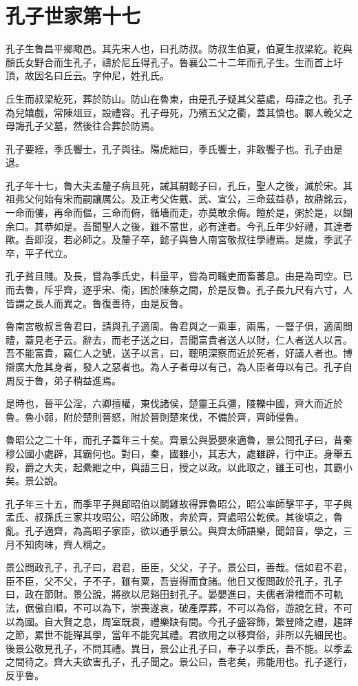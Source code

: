 \chapter{孔子世家第十七}

孔子生魯昌平鄉陬邑。其先宋人也，曰孔防叔。防叔生伯夏，伯夏生叔梁紇。紇與顏氏女野合而生孔子，禱於尼丘得孔子。魯襄公二十二年而孔子生。生而首上圩頂，故因名曰丘云。字仲尼，姓孔氏。

丘生而叔梁紇死，葬於防山。防山在魯東，由是孔子疑其父墓處，母諱之也。孔子為兒嬉戲，常陳俎豆，設禮容。孔子母死，乃殯五父之衢，蓋其慎也。郰人輓父之母誨孔子父墓，然後往合葬於防焉。

孔子要絰，季氏饗士，孔子與往。陽虎絀曰，季氏饗士，非敢饗子也。孔子由是退。

孔子年十七，魯大夫孟釐子病且死，誡其嗣懿子曰，孔丘，聖人之後，滅於宋。其祖弗父何始有宋而嗣讓厲公。及正考父佐戴、武、宣公，三命茲益恭，故鼎銘云，一命而僂，再命而傴，三命而俯，循墻而走，亦莫敢余侮。饘於是，粥於是，以餬余口。其恭如是。吾聞聖人之後，雖不當世，必有達者。今孔丘年少好禮，其達者歟。吾即沒，若必師之。及釐子卒，懿子與魯人南宮敬叔往學禮焉。是歲，季武子卒，平子代立。

孔子貧且賤。及長，嘗為季氏史，料量平，嘗為司職吏而畜蕃息。由是為司空。已而去魯，斥乎齊，逐乎宋、衛，困於陳蔡之間，於是反魯。孔子長九尺有六寸，人皆謂之長人而異之。魯復善待，由是反魯。

魯南宮敬叔言魯君曰，請與孔子適周。魯君與之一乘車，兩馬，一豎子俱，適周問禮，蓋見老子云。辭去，而老子送之曰，吾聞富貴者送人以財，仁人者送人以言。吾不能富貴，竊仁人之號，送子以言，曰，聰明深察而近於死者，好議人者也。博辯廣大危其身者，發人之惡者也。為人子者毋以有己，為人臣者毋以有己。孔子自周反于魯，弟子稍益進焉。

是時也，晉平公淫，六卿擅權，東伐諸侯，楚靈王兵彊，陵轢中國，齊大而近於魯。魯小弱，附於楚則晉怒，附於晉則楚來伐，不備於齊，齊師侵魯。

魯昭公之二十年，而孔子蓋年三十矣。齊景公與晏嬰來適魯，景公問孔子曰，昔秦穆公國小處辟，其霸何也。對曰，秦，國雖小，其志大，處雖辟，行中正。身舉五羖，爵之大夫，起纍紲之中，與語三日，授之以政。以此取之，雖王可也，其霸小矣。景公說。

孔子年三十五，而季平子與郈昭伯以鬬雞故得罪魯昭公，昭公率師擊平子，平子與孟氏、叔孫氏三家共攻昭公，昭公師敗，奔於齊，齊處昭公乾侯。其後頃之，魯亂。孔子適齊，為高昭子家臣，欲以通乎景公。與齊太師語樂，聞韶音，學之，三月不知肉味，齊人稱之。

景公問政孔子，孔子曰，君君，臣臣，父父，子子。景公曰，善哉。信如君不君，臣不臣，父不父，子不子，雖有粟，吾豈得而食諸。他日又復問政於孔子，孔子曰，政在節財。景公說，將欲以尼谿田封孔子。晏嬰進曰，夫儒者滑稽而不可軌法，倨傲自順，不可以為下，崇喪遂哀，破產厚葬，不可以為俗，游說乞貸，不可以為國。自大賢之息，周室既衰，禮樂缺有間。今孔子盛容飾，繁登降之禮，趨詳之節，累世不能殫其學，當年不能究其禮。君欲用之以移齊俗，非所以先細民也。後景公敬見孔子，不問其禮。異日，景公止孔子曰，奉子以季氏，吾不能。以季孟之間待之。齊大夫欲害孔子，孔子聞之。景公曰，吾老矣，弗能用也。孔子遂行，反乎魯。

